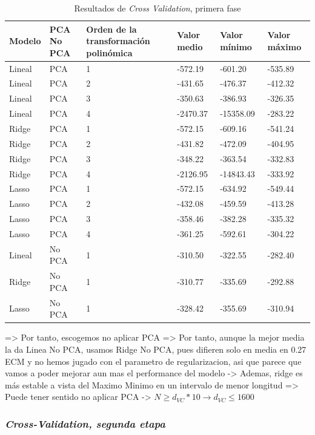 \documentclass[11pt]{article}
\begin{document}
\begin{table}[H]
\begin{tabularx}{\textwidth}{|X|X|X|X|X|X|}
    \hline
    \textbf{Modelo} & \textbf{PCA \/ No PCA}& \textbf{Orden de la transformación polinómica} & \textbf{Valor medio} & \textbf{Valor mínimo} & \textbf{Valor máximo} \\
    \hline
    Lineal & PCA & 1 & -572.19 & -601.20 & -535.89 \\
    Lineal & PCA & 2 & -431.65 &-476.37 & -412.32 \\
    Lineal & PCA & 3 &-350.63 &-386.93 & -326.35 \\
    Lineal & PCA & 4 & -2470.37 &-15358.09 & -283.22 \\
    Ridge  & PCA & 1 &-572.15 &-609.16 & -541.24 \\
    Ridge  & PCA & 2 & -431.82 &-472.09 & -404.95 \\
    Ridge  & PCA & 3 & -348.22 &-363.54 & -332.83 \\
    Ridge  & PCA & 4 & -2126.95 &-14843.43 & -333.92 \\
    Lasso  & PCA & 1 & -572.15 &-634.92 & -549.44 \\
    Lasso  & PCA & 2 & -432.08 &-459.59 & -413.28 \\
    Lasso  & PCA & 3 & -358.46 &-382.28 & -335.32 \\
    Lasso  & PCA & 4 & -361.25 &-592.61 & -304.22 \\
    Lineal & No PCA & 1 & -310.50 &-322.55 & -282.40 \\
    Ridge  & No PCA & 1 & -310.77 &-335.69 & -292.88 \\
    Lasso  & No PCA & 1 & -328.42 &-355.69 & -310.94 \\
    \hline
\end{tabularx}
    \caption{Resultados de \emph{Cross Validation}, primera fase}
\end{table}

=> Por tanto, escogemos no aplicar PCA
=> Por tanto, aunque la mejor media la da Linea No PCA, usamos Ridge No PCA, pues difieren solo en media en 0.27 ECM y no hemos jugado con el parametro de regularizacion, asi que parece que vamos a poder mejorar aun mas el performance del modelo
    -> Ademas, ridge es más estable a vista del Maximo Minimo en un intervalo de menor longitud
=> Puede tener sentido no aplicar PCA -> $N \geq d_{VC} * 10 \rightarrow d_{VC} \leq 1600$

\subsubsection{\emph{Cross-Validation, segunda etapa}}
\end{document}
